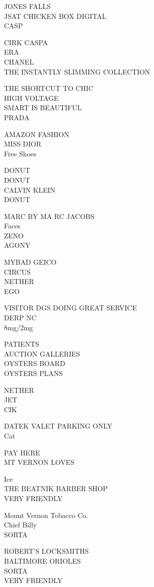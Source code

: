 \documentclass[10pt,letterpaper]{article}
\begin{document}
JONES FALLS\\
JSAT CHICKEN BOX DIGITAL\\
CASP

CIRK CASPA\\
ERA\\
CHANEL\\
THE INSTANTLY SLIMMING COLLECTION

THE SHORTCUT TO CHIC\\
HIGH VOLTAGE\\
SMART IS BEAUTIFUL\\
PRADA

AMAZON FASHION\\
MISS DIOR\\
Free Shoes

DONUT\\
DONUT\\
CALVIN KLEIN\\
DONUT

MARC BY MA RC JACOBS\\
Faces\\
ZENO\\
AGONY

MYBAD GEICO\\
CIRCUS\\
NETHER\\
EGO

VISITOR DGS DOING GREAT SERVICE\\
DERP NC\\
8mg/2mg

PATIENTS\\
AUCTION GALLERIES\\
OYSTERS BOARD\\
OYSTERS PLANS

NETHER\\
JET\\
CIK

DATEK VALET PARKING ONLY\\
Cat

PAY HERE\\
MT VERNON LOVES

Ice\\
THE BEATNIK BARBER SHOP\\
VERY FRIENDLY

Mount Vernon Tobacco Co.\\
Chief Billy\\
SORTA

ROBERT'S LOCKSMITHS\\
BALTIMORE ORIOLES\\
SORTA\\
VERY FRIENDLY
\end{document}
